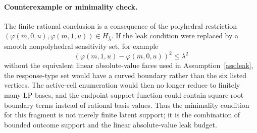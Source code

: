 \paragraph{Counterexample or minimality check.}
The finite rational conclusion is a consequence of the polyhedral restriction
\((\varphi(m,0,u),\varphi(m,1,u))\in H_{\bar\lambda}\). If the leak condition were replaced by a smooth
nonpolyhedral sensitivity set, for example
\[
  (\varphi(m,1,u)-\varphi(m,0,u))^2\le \lambda^2
\]
without the equivalent linear absolute-value faces used in Assumption~\ref{ass:leak}, the response-type set
would have a curved boundary rather than the six listed vertices. The active-cell enumeration would then no
longer reduce to finitely many LP bases, and the endpoint support function could contain square-root boundary
terms instead of rational basis values. Thus the minimality condition for this fragment is not merely finite
latent support; it is the combination of bounded outcome support and the linear absolute-value leak budget.
